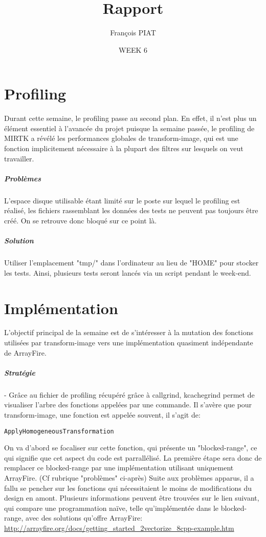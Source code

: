 \documentclass{report}
\title{Rapport}
\author{François PIAT}
\date{WEEK 6}
\begin{document}
\maketitle

\chapter*{Profiling}
Durant cette semaine, le profiling passe au second plan. En effet, il n'est plus un élément essentiel à l'avancée du projet puisque la semaine passée, le profiling de MIRTK a révélé les performances globales de transform-image, qui est une fonction implicitement nécessaire à la plupart des filtres sur lesquels on veut travailler.
\paragraph{Problèmes}
L'espace disque utilisable étant limité sur le poste sur lequel le profiling est réalisé, les fichiers rassemblant les données des tests ne peuvent pas toujours être créé. On se retrouve donc bloqué sur ce point là.

\paragraph{Solution}
Utiliser l'emplacement "tmp/" dans l'ordinateur au lieu de "HOME" pour stocker les tests. Ainsi, plusieurs tests seront lancés via un script pendant le week-end.
\chapter*{Implémentation}	
L'objectif principal de la semaine est de s'intéresser à la mutation des fonctions utilisées par transform-image vers une implémentation quasiment indépendante de ArrayFire.
\paragraph{Stratégie}
- Grâce au fichier de profiling récupéré grâce à callgrind, kcachegrind permet de visualiser l'arbre des fonctions appelées par une commande. Il s'avère que pour transform-image, une fonction est appelée souvent, il s'agit de: \begin{lstlisting} 
ApplyHomogeneousTransformation
\end{lstlisting} 
On va d'abord se focaliser sur cette fonction, qui présente un "blocked-range", ce qui signifie que cet aspect du code est parrallélisé. La première étape sera donc de remplacer ce blocked-range par une implémentation utilisant uniquement ArrayFire.
\newline
\newline
(Cf rubrique "problèmes" ci-après) Suite aux problèmes apparus, il a fallu se pencher sur les fonctions qui nécessitaient le moins de modifications du design en amont.
\newline
\newline
Plusieurs informations peuvent être trouvées sur le lien suivant, qui compare une programmation naïve, telle qu'implémentée dans le blocked-range, avec des solutions qu'offre ArrayFire:
\url{http://arrayfire.org/docs/getting_started_2vectorize_8cpp-example.htm}
\end{document}
